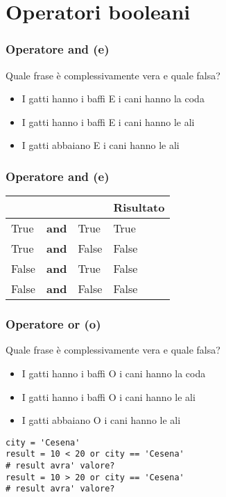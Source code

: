 \section{Operatori booleani}

\begin{frame}[fragile]
\frametitle{Operatore and (e)}
\begin{block}{Quale frase è complessivamente vera e quale falsa?}
    \begin{itemize}
        \item I gatti hanno i baffi E i cani hanno la coda
        \item I gatti hanno i baffi E i cani hanno le ali
        \item I gatti abbaiano E i cani hanno le ali
    \end{itemize}
\end{block}

\end{frame}

\begin{frame}[fragile]
\frametitle{Operatore and (e)}

\begin{tabu} to 0.8\textwidth { | X[l] | X[c] | X[c] |  X[r] |}
 \hline
  & & & Risultato\\
 \hline
 True & \textbf{and} & True & True\\
 \hline
 True & \textbf{and} & False & False\\
 \hline
 False & \textbf{and} & True & False\\
\hline
 False & \textbf{and} & False& False\\
\hline
\end{tabu}

\end{frame}

\begin{frame}[fragile]
\frametitle{Operatore or (o)}
\begin{block}{Quale frase è complessivamente vera e quale falsa?}
    \begin{itemize}
        \item I gatti hanno i baffi O i cani hanno la coda
        \item I gatti hanno i baffi O i cani hanno le ali
        \item I gatti abbaiano O i cani hanno le ali
    \end{itemize}
\end{block}

    \begin{lstlisting}
city = 'Cesena'
result = 10 < 20 or city == 'Cesena'
# result avra' valore?
result = 10 > 20 or city == 'Cesena'
# result avra' valore?
    \end{lstlisting}

\end{frame}

